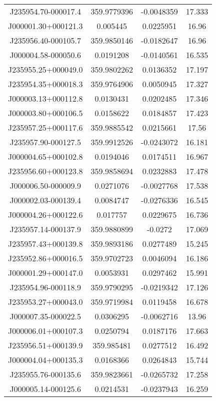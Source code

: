 \begin{table}
\begin{tabular}{cccc}
J235954.70-000017.4 & 359.9779396 & -0.0048359 & 17.333 \\
J000001.30+000121.3 & 0.005445 & 0.0225951 & 16.96 \\
J235956.40-000105.7 & 359.9850146 & -0.0182647 & 16.96 \\
J000004.58-000050.6 & 0.0191208 & -0.0140561 & 16.535 \\
J235955.25+000049.0 & 359.9802262 & 0.0136352 & 17.197 \\
J235954.35+000018.3 & 359.9764906 & 0.0050945 & 17.327 \\
J000003.13+000112.8 & 0.0130431 & 0.0202485 & 17.346 \\
J000003.80+000106.5 & 0.0158622 & 0.0184857 & 17.423 \\
J235957.25+000117.6 & 359.9885542 & 0.0215661 & 17.56 \\
J235957.90-000127.5 & 359.9912526 & -0.0243072 & 16.181 \\
J000004.65+000102.8 & 0.0194046 & 0.0174511 & 16.967 \\
J235956.60+000123.8 & 359.9858694 & 0.0232883 & 17.478 \\
J000006.50-000009.9 & 0.0271076 & -0.0027768 & 17.538 \\
J000002.03-000139.4 & 0.0084747 & -0.0276336 & 16.545 \\
J000004.26+000122.6 & 0.017757 & 0.0229675 & 16.736 \\
J235957.14-000137.9 & 359.9880899 & -0.0272 & 17.069 \\
J235957.43+000139.8 & 359.9893186 & 0.0277489 & 15.245 \\
J235952.86+000016.5 & 359.9702723 & 0.0046094 & 16.186 \\
J000001.29+000147.0 & 0.0053931 & 0.0297462 & 15.991 \\
J235954.96-000118.9 & 359.9790295 & -0.0219342 & 17.126 \\
J235953.27+000043.0 & 359.9719984 & 0.0119458 & 16.678 \\
J000007.35-000022.5 & 0.0306295 & -0.0062716 & 13.96 \\
J000006.01+000107.3 & 0.0250794 & 0.0187176 & 17.663 \\
J235956.51+000139.9 & 359.985481 & 0.0277512 & 16.492 \\
J000004.04+000135.3 & 0.0168366 & 0.0264843 & 15.744 \\
J235955.76-000135.6 & 359.9823661 & -0.0265732 & 17.258 \\
J000005.14-000125.6 & 0.0214531 & -0.0237943 & 16.259 \\

\end{tabular}
\end{table}
